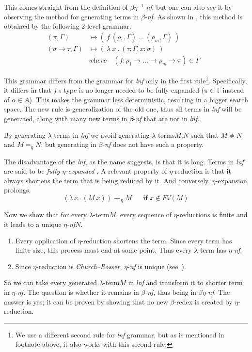 \documentclass{sig-alternate}
\newcommand{\lterm}{$\lambda$-term\xspace}
\newcommand{\lterms}{$\lambda$-terms\xspace}
\newcommand{\lamb}[2]{( \lambda \, #1 \, . \, #2 )}
\newcommand{\ered}{$\eta$-reduction\xspace}
\newcommand{\bnf}{$\beta$-\textit{nf}\xspace}
\newcommand{\enf}{$\eta$-\textit{nf}\xspace}
\newcommand{\beenf}{$\beta\eta^{-1}$-\textit{nf}\xspace}
\newcommand{\benf}{$\beta\eta$-\textit{nf}\xspace}
\newcommand{\bredex}{$\beta$-redex\xspace}
\newcommand{\lnf}{\textit{lnf}\xspace}
\newcommand{\ar}{\rightarrow\xspace}
\newcommand{\T}{\mathbb{T}\xspace}
\newcommand{\gar}{\longmapsto}
\newcommand{\eArrow}{\rightarrow_\eta\xspace}
\begin{document}
This comes straight from the definition of \beenf, 
but one can also see it by observing the method for generating
terms in \bnf. As shown in \cite{barendregt10}, 
this method is obtained by the following 2-level grammar.
\begin{align*}
( \pi , \Gamma )  
&\gar
(~f~( \rho_1 , \Gamma )~\dots~( \rho_m , \Gamma )~)
\\ 
( \sigma \rightarrow \tau , \Gamma )  
&\gar
(~\lambda~x~.~( \tau ; \Gamma,x:\sigma )~)
&   
\\& \textit{where~~~} (f : \rho_1 \ar \dots \ar \rho_m \ar \pi) \in \Gamma
\end{align*}

This grammar differs from the grammar for \lnf only in the first rule\footnote{We use a different second rule for \lnf grammar, but as is mentioned in footnote above, it also works with this second rule.}. Specifically, it differs in that $f$'s type is no longer needed to be fully expanded ($\pi \in \T$ instead of $\alpha \in A$). This makes the grammar less deterministic,
resulting in a bigger search space. The new rule is generalization of the old one,
thus all terms in \lnf will be generated, along with many new terms in \bnf that 
are not in \lnf. 
    
By generating \lterms in \lnf we avoid generating 
\lterms $M$,$N$ such that $M \not= N$ and $M =_{\eta} N$; 
but generating in \bnf does not have such a property.


The disadvantage of the \lnf, as the name suggests, is that it is long.
Terms in \lnf are said to be \textit{fully $\eta$-expanded} \cite{barendregt10}. 
A relevant property of $\eta$-reduction is that it always shortens the term
that is being reduced by it. And conversely, $\eta$-expansion prolongs.
$$\lamb{x}{(M~x)} \eArrow M \textbf{ ~~~~if } x \not\in FV(M) $$

Now we show that for every \lterm $M$, 
every sequence of $\eta$-reductions is finite and
it leads to a unique \enf $N$.

\begin{enumerate}
 \item Every application of \ered shortens the term.
       Since every term has finite size, this process must 
       end at some point. Thus every \lterm has \enf.
 \item Since \ered is \textit{Church–Rosser}, \enf is unique (see~\cite{barendregt84}). 
\end{enumerate}

So we can take every generated \lterm $M$ in 
\lnf and transform it to shorter term in \enf. 
The question is whether it remains in \bnf, thus being in \benf.
The answer is yes; it can be proven by showing that no 
new \bredex is created by \ered.  
\end{document}

